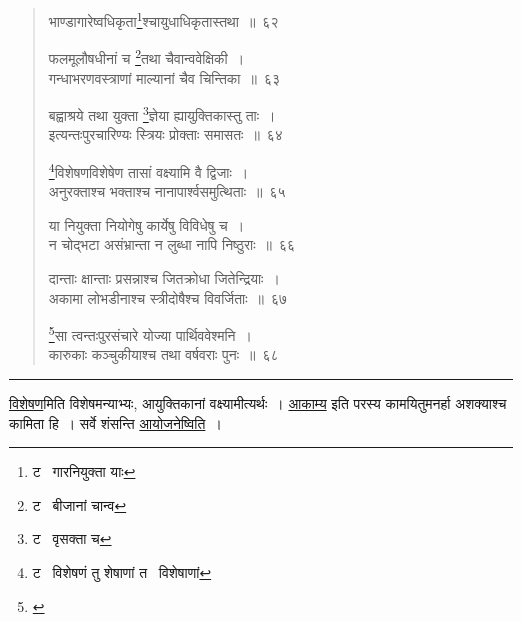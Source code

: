 \documentclass[11pt, openany]{book}
\begin{document}
\begin{quote}
{\na भाण्डागारेष्वधिकृता\renewcommand{\thefootnote}{1}\footnote{ट \textendash\  गारनियुक्ता याः}श्चायुधाधिकृतास्तथा~॥~६२

फलमूलौषधीनां च \renewcommand{\thefootnote}{2}\footnote{ट \textendash\  बीजानां चान्व}तथा चैवान्ववेक्षिकी~।\\
गन्धाभरणवस्त्राणां माल्यानां चैव चिन्तिका~॥~६३

बह्वाश्रये तथा युक्ता \renewcommand{\thefootnote}{3}\footnote{ट \textendash\  वृसक्ता च}ज्ञेया ह्यायुक्तिकास्तु ताः~।\\
इत्यन्तःपुरचारिण्यः स्त्रियः प्रोक्ताः समासतः~॥~६४

\renewcommand{\thefootnote}{4}\footnote{ट \textendash\  विशेषणं तु शेषाणां त \textendash\  विशेषाणां}विशेषणविशेषेण तासां वक्ष्यामि वै द्विजाः~।\\
अनुरक्ताश्च भक्ताश्च नानापार्श्वसमुत्थिताः~॥~६५

या नियुक्ता नियोगेषु कार्येषु विविधेषु च~।\\
न चोद्भटा असंभ्रान्ता न लुब्धा नापि निष्ठुराः~॥~६६

दान्ताः क्षान्ताः प्रसन्नाश्च जितक्रोधा जितेन्द्रियाः~।\\
अकामा लोभडीनाश्च स्त्रीदोषैश्च विवर्जिताः~॥~६७

\renewcommand{\thefootnote}{5}\footnote{\begin{quote}
{\qt [एवं विधास्तु कर्तव्या नियोगिन्यो नियोक्तृभिः~।\\
अतः परं प्रवक्ष्यामि तृतीयं प्रकृतिं द्विजाः~॥

यस्यान्नपुंसकं नाम द्वितीया प्रकृतिः स्मृता~।]}
\end{quote}}सा त्वन्तःपुरसंचारे योज्या पार्थिववेश्मनि~।\\
कारुकाः कञ्चुकीयाश्च तथा वर्षवराः पुनः~॥~६८}
\end{quote}

\hrule

\vspace{2mm}
\underline{विशेषण}मिति विशेषमन्याभ्यः, आयुक्तिकानां वक्ष्यामीत्यर्थः~। \underline{आकाम्य} इति परस्य कामयितुमनर्हा अशक्याश्च कामिता हि~। सर्वे शंसन्ति \underline{आयोजनेष्विति}~।

\newpage
\end{document}
